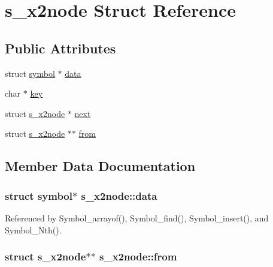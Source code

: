 \hypertarget{structs__x2node}{\section{s\-\_\-x2node Struct Reference}
\label{structs__x2node}
}
\subsection*{Public Attributes}
\begin{DoxyCompactItemize}
\item 
struct \hyperlink{structsymbol}{symbol} $\ast$ \hyperlink{structs__x2node_aa78fbe3931073a2f153615a789dcf1da}{data}
\item 
char $\ast$ \hyperlink{structs__x2node_aba3c34d4d54ec3874153b7e317b883a5}{key}
\item 
struct \hyperlink{structs__x2node}{s\-\_\-x2node} $\ast$ \hyperlink{structs__x2node_ac9edb947528c1ce035c50b263a0211ab}{next}
\item 
struct \hyperlink{structs__x2node}{s\-\_\-x2node} $\ast$$\ast$ \hyperlink{structs__x2node_ae3951b8c89177f8d8569ff7306fa687c}{from}
\end{DoxyCompactItemize}


\subsection{Member Data Documentation}
\hypertarget{structs__x2node_aa78fbe3931073a2f153615a789dcf1da}{
\subsubsection[{data}]{\setlength{\rightskip}{0pt plus 5cm}struct {\bf symbol}$\ast$ s\-\_\-x2node\-::data}}\label{structs__x2node_aa78fbe3931073a2f153615a789dcf1da}


Referenced by Symbol\-\_\-arrayof(), Symbol\-\_\-find(), Symbol\-\_\-insert(), and Symbol\-\_\-\-Nth().

\hypertarget{structs__x2node_ae3951b8c89177f8d8569ff7306fa687c}{
\subsubsection[{from}]{\setlength{\rightskip}{0pt plus 5cm}struct {\bf s\-\_\-x2node}$\ast$$\ast$ s\-\_\-x2node\-::from}}\label{structs__x2node_ae3951b8c89177f8d8569ff7306fa687c}


